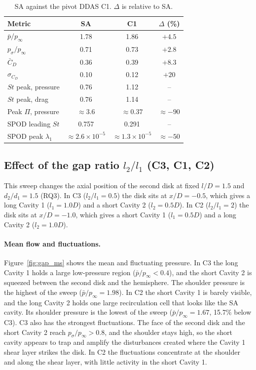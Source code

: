 \documentclass[11pt,a4paper]{article}
\newcommand{\pbar}{\bar{p}/p_\infty}
\newcommand{\psd}{p_\sigma/p_\infty}
\newcommand{\Cdm}{\bar{C}_D}
\newcommand{\sCd}{\sigma_{C_D}}
\newcommand{\ltl}{l_2/l_1}
\newcommand{\dtd}{d_2/d_1}
\begin{document}
\begin{table}[htbp]
  \centering
  \caption{SA against the pivot DDAS C1. $\Delta$ is relative to SA.}
  \label{tab:sac1}
  \begin{tabular}{lccc}
    \toprule
    Metric & SA & C1 & $\Delta$ (\%) \\
    \midrule
    $\pbar$ & 1.78 & 1.86 & $+4.5$ \\
    $\psd$ & 0.71 & 0.73 & $+2.8$ \\
    $\Cdm$ & 0.36 & 0.39 & $+8.3$ \\
    $\sCd$ & 0.10 & 0.12 & $+20$ \\
    $St$ peak, pressure & 0.76 & 1.12 & -- \\
    $St$ peak, drag & 0.76 & 1.14 & -- \\
    Peak $\Pi$, pressure & $\approx 3.6$ & $\approx 0.37$ & $\approx -90$ \\
    SPOD leading $St$ & 0.757 & 0.291 & -- \\
    SPOD peak $\lambda_1$ & $\approx 2.6\times10^{-5}$ & $\approx 1.3\times10^{-5}$ & $\approx -50$ \\
    \bottomrule
  \end{tabular}
\end{table}

\subsection{Effect of the gap ratio $\ltl$ (C3, C1, C2)}\label{sec:gap}

This sweep changes the axial position of the second disk at fixed $l/D = 1.5$ and $\dtd = 1.5$ (RQ3). In C3 ($\ltl = 0.5$) the disk sits at $x/D = -0.5$, which gives a long Cavity 1 ($l_1 = 1.0D$) and a short Cavity 2 ($l_2 = 0.5D$). In C2 ($\ltl = 2$) the disk sits at $x/D = -1.0$, which gives a short Cavity 1 ($l_1 = 0.5D$) and a long Cavity 2 ($l_2 = 1.0D$).

\paragraph{Mean flow and fluctuations.} Figure~\ref{fig:gap_ms} shows the mean and fluctuating pressure. In C3 the long Cavity 1 holds a large low-pressure region ($\pbar < 0.4$), and the short Cavity 2 is squeezed between the second disk and the hemisphere. The shoulder pressure is the highest of the sweep ($\pbar = 1.98$). In C2 the short Cavity 1 is barely visible, and the long Cavity 2 holds one large recirculation cell that looks like the SA cavity. Its shoulder pressure is the lowest of the sweep ($\pbar = 1.67$, 15.7\% below C3). C3 also has the strongest fluctuations. The face of the second disk and the short Cavity 2 reach $\psd > 0.8$, and the shoulder stays high, so the short cavity appears to trap and amplify the disturbances created where the Cavity 1 shear layer strikes the disk. In C2 the fluctuations concentrate at the shoulder and along the shear layer, with little activity in the short Cavity 1.
\end{document}
